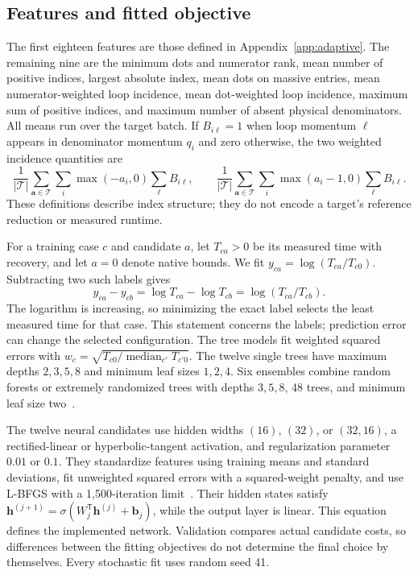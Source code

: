 \subsection{Features and fitted objective}
The first eighteen features are those defined in Appendix~\ref{app:adaptive}. The remaining nine are the minimum dots and numerator rank, mean number of positive indices, largest absolute index, mean dots on massive entries, mean numerator-weighted loop incidence, mean dot-weighted loop incidence, maximum sum of positive indices, and maximum number of absent physical denominators. All means run over the target batch. If $B_{i\ell}=1$ when loop momentum $\ell$ appears in denominator momentum $q_i$ and zero otherwise, the two weighted incidence quantities are
\begin{equation}
 \frac1{|\mathcal T|}\sum_{\boldsymbol a\in\mathcal T}\sum_i\max(-a_i,0)\sum_\ell B_{i\ell},
 \qquad
 \frac1{|\mathcal T|}\sum_{\boldsymbol a\in\mathcal T}\sum_i\max(a_i-1,0)\sum_\ell B_{i\ell}.
\label{eq:bounds-incidence}
\end{equation}
These definitions describe index structure; they do not encode a target's reference reduction or measured runtime.

For a training case $c$ and candidate $a$, let $T_{ca}>0$ be its measured time with recovery, and let $a=0$ denote native bounds. We fit $y_{ca}=\log(T_{ca}/T_{c0})$. Subtracting two such labels gives
\begin{equation}
 y_{ca}-y_{cb}=\log T_{ca}-\log T_{cb}=\log(T_{ca}/T_{cb}).
\end{equation}
The logarithm is increasing, so minimizing the exact label selects the least measured time for that case. This statement concerns the labels; prediction error can change the selected configuration. The tree models fit weighted squared errors with $w_c=\sqrt{T_{c0}/\operatorname{median}_{c'}T_{c'0}}$. The twelve single trees have maximum depths $2,3,5,8$ and minimum leaf sizes $1,2,4$. Six ensembles combine random forests or extremely randomized trees with depths $3,5,8$, 48 trees, and minimum leaf size two~\cite{CART1984,Breiman2001Forest,Geurts2006ExtraTrees}.

The twelve neural candidates use hidden widths $(16)$, $(32)$, or $(32,16)$, a rectified-linear or hyperbolic-tangent activation, and regularization parameter $0.01$ or $0.1$. They standardize features using training means and standard deviations, fit unweighted squared errors with a squared-weight penalty, and use L-BFGS with a 1,500-iteration limit~\cite{Pedregosa2011Bounds}. Their hidden states satisfy $\boldsymbol h^{(j+1)}=\sigma(W_j^\mathsf{T}\boldsymbol h^{(j)}+\boldsymbol b_j)$, while the output layer is linear. This equation defines the implemented network. Validation compares actual candidate costs, so differences between the fitting objectives do not determine the final choice by themselves. Every stochastic fit uses random seed 41.


